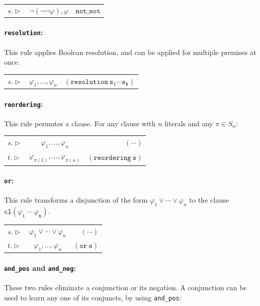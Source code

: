 \noindent\begin{tabularx}{\linewidth}{ l C r }
	$s.\triangleright$ & 
	$\lnot(\lnot\lnot\varphi),\varphi$ & 
	${\mathtt{not\_not}}$
\end{tabularx}

\paragraph{\texttt{resolution}:} This rule applies Boolean resolution, and can be applied for multiple premises at once.

\noindent\begin{tabularx}{\linewidth}{ l C r }
	$s.\triangleright$ & 
	$\varphi_1,\dots,\varphi_n$ & 
	${\mathtt{(resolution \: s_1\cdots s_k)}}$
\end{tabularx}

\paragraph{\texttt{reordering}:} This rule permutes a clause. For any clause with $n$ literals and any $\pi\in S_n$:

\noindent\begin{tabularx}{\linewidth}{ l C r }
	$s.\triangleright$ & 
	$\varphi_1,\dots,\varphi_n$ & 
	${\mathtt{(\cdots)}}$ \\
	
	$t.\triangleright$ & 
	$\varphi_{\pi(1)},\dots,\varphi_{\pi(n)}$ & 
	${\mathtt{(reordering \: s)}}$
\end{tabularx}

\paragraph{\texttt{or}:} This rule transforms a disjunction of the form $\varphi_1\lor\cdots\lor\varphi_n$ to the clause $\mathtt{cl(\varphi_1 \: \cdots \: \varphi_n)}$.

\noindent\begin{tabularx}{\linewidth}{ l C r }
	$s.\triangleright$ & 
	$\varphi_1\lor\cdots\lor\varphi_n$ & 
	$(\cdots)$ \\
	
	$t.\triangleright$ &
	$\varphi_1,\dots,\varphi_n$ &
	${\mathtt{(or \: s)}}$
\end{tabularx}

\paragraph{\texttt{and\_pos} and \texttt{and\_neg}:} These two rules eliminate a conjunction or its negation.
A conjunction can be used to learn any one of its conjuncts, by using 
\texttt{and\_pos}:

